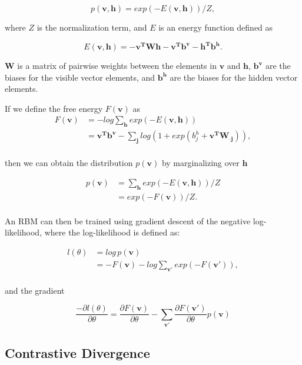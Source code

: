 \documentclass{article}
\begin{document}
\[
  p \left( \mathbf{v}, \mathbf{h} \right) = 
  exp \left(-E \left( \mathbf{v}, \mathbf{h} \right) \right) / Z,
\]

where $Z$ is the normalization term, and $E$ is an energy function defined as

\[
  E \left( \mathbf{v}, \mathbf{h} \right) = 
  - \mathbf{v^TWh} - \mathbf{v^Tb^v} - \mathbf{h^Tb^h}.
\]

$\mathbf{W}$ is a matrix of pairwise weights between the elements in 
$\mathbf{v}$ and $\mathbf{h}$, $\mathbf{b^v}$ are the biases for the visible
vector elements, and $\mathbf{b^h}$ are the biases for the hidden vector
elements.

If we define the free energy $F(\mathbf{v})$ as
\begin{align*}
  F \left( \mathbf{v} \right) &= -log \sum_{\mathbf{h}} exp \left( -E \left( \mathbf{v,h} \right) \right) \\
  &= \mathbf{v^Tb^v} - \sum_{\mathbf{j}} log
    \left(
      1 + exp \left( b_j^h + \mathbf{v^TW_{\cdot j}} \right)
    \right), \\
\end{align*}

then we can obtain the distribution $p(\mathbf{v})$ by marginalizing over
$\mathbf{h}$

\begin{align*}
  p(\mathbf{v}) &= \sum_{\mathbf{h}} exp(-E(\mathbf{v, h})) / Z \\
                &= exp(-F(\mathbf{v})) / Z. \\
\end{align*}

An RBM can then be trained using gradient descent of the negative
log-likelihood, where the log-likelihood is defined as:

\begin{align*}
  l(\theta) &= log \, p(\mathbf{v}) \\
            &= -F(\mathbf{v}) - log \sum_{\mathbf{v'}} exp (-F(\mathbf{v'})), \\
\end{align*}

and the gradient

\[
  \frac{- \partial l(\theta)}{\partial \theta}
  = \frac{\partial F(\mathbf{v})}{\partial \theta} - 
  \sum_{\mathbf{v'}}\frac{\partial F(\mathbf{v'})}{\partial \theta}
                  p(\mathbf{v})
\]


\subsection{Contrastive Divergence}
\end{document}
